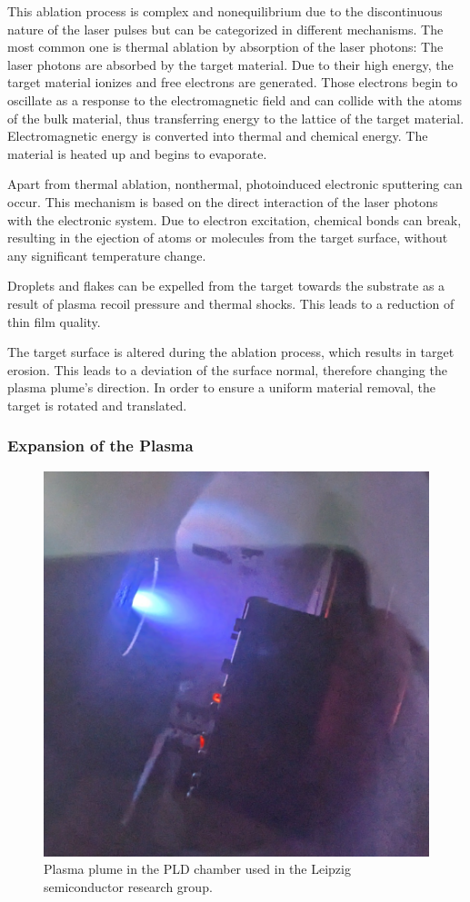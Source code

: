 This ablation process is complex and nonequilibrium due to the discontinuous nature 
of the laser pulses but can be categorized in different mechanisms. 
The most common one is thermal ablation by absorption of the laser photons:
The laser photons are absorbed by the target material.
Due to their high energy, the target material ionizes and 
free electrons are generated.
Those electrons begin to oscillate as a response to the electromagnetic field 
and can collide with the atoms of the bulk material,
thus transferring energy to the lattice of the target material.
Electromagnetic energy is converted into thermal and chemical energy.
The material is heated up and begins to evaporate.

Apart from thermal ablation, nonthermal, photoinduced electronic sputtering can occur.
This mechanism is based on the direct interaction of the laser photons with the 
electronic system.
Due to electron excitation, chemical bonds can break, resulting in the ejection of
atoms or molecules from the target surface, without any significant temperature change. 

Droplets and flakes can be expelled from the target towards the substrate as a result
of plasma recoil pressure and thermal shocks. 
This leads to a reduction of thin film quality.

The target surface is altered during the ablation process, which results in target 
erosion.
This leads to a deviation of the surface normal, therefore changing the plasma 
plume's direction.
In order to ensure a uniform material removal, the target is rotated and translated.

\subsubsection{Expansion of the Plasma}

\begin{figure}
	\centering
	\includegraphics[width=0.6\columnwidth]{../assets/plume.pdf}
	\caption{Plasma plume in the PLD chamber used in the Leipzig 
	semiconductor research group.}
	\label{fig:plume}
\end{figure}

